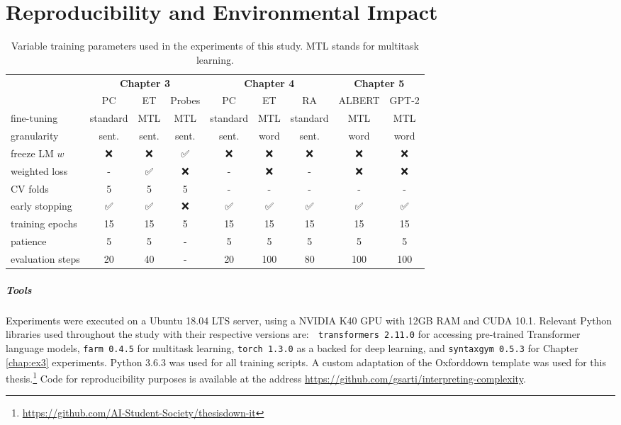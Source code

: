 \documentclass[a4paper, nobind]{templates/ociamthesis}
\begin{document}
\hypertarget{app:params}{%
\chapter{Reproducibility and Environmental Impact}\label{app:params}}

\begin{table}[!h]

\caption{\label{tab:train-params}Variable training parameters used in the experiments of this study. MTL stands for multitask learning.}
\centering
\fontsize{11}{13}\selectfont
\begin{tabular}[t]{lcc>{}c|cc>{}c|cc}
\toprule
\multicolumn{1}{c}{\textbf{ }} & \multicolumn{3}{c}{\textbf{Chapter 3}} & \multicolumn{3}{c}{\textbf{Chapter 4}} & \multicolumn{2}{c}{\textbf{Chapter 5}} \\
\cmidrule(l{3pt}r{3pt}){2-4} \cmidrule(l{3pt}r{3pt}){5-7} \cmidrule(l{3pt}r{3pt}){8-9}
 & PC & ET & Probes & PC & ET & RA & ALBERT & GPT-2\\
\midrule
fine-tuning & standard & MTL & MTL & standard & MTL & standard & MTL & MTL\\
granularity & sent. & sent. & sent. & sent. & word & sent. & word & word\\
freeze LM $w$ & ❌ & ❌ & ✅ & ❌ & ❌ & ❌ & ❌ & ❌\\
weighted loss & - & ✅ & ❌ & - & ❌ & - & ❌ & ❌\\
CV folds & 5 & 5 & 5 & - & - & - & - & -\\
early stopping & ✅ & ✅ & ❌ & ✅ & ✅ & ✅ & ✅ & ✅\\
training epochs & 15 & 15 & 5 & 15 & 15 & 15 & 15 & 15\\
patience & 5 & 5 & - & 5 & 5 & 5 & 5 & 5\\
evaluation steps & 20 & 40 & - & 20 & 100 & 80 & 100 & 100\\
\bottomrule
\end{tabular}
\end{table}

\paragraph{Tools} Experiments were executed on a Ubuntu 18.04 LTS server, using a NVIDIA K40 GPU with 12GB RAM and CUDA 10.1. Relevant Python libraries used throughout the study with their respective versions are: 🤗 \texttt{transformers\ 2.11.0} for accessing pre-trained Transformer language models, \texttt{farm\ 0.4.5} for multitask learning, \texttt{torch\ 1.3.0} as a backed for deep learning, and \texttt{syntaxgym\ 0.5.3} for Chapter \ref{chap:ex3} experiments. Python 3.6.3 was used for all training scripts. A custom adaptation of the Oxforddown template was used for this thesis.\footnote{\url{https://github.com/AI-Student-Society/thesisdown-it}} Code for reproducibility purposes is available at the address \url{https://github.com/gsarti/interpreting-complexity}.
\end{document}
